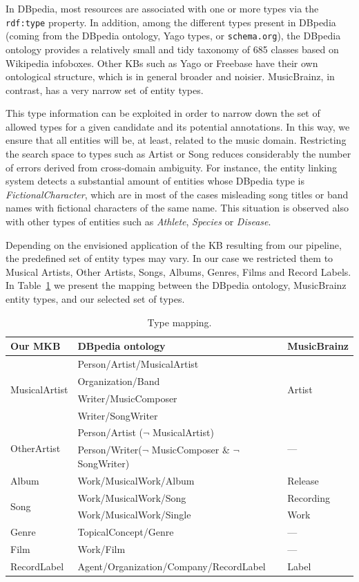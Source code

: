 In DBpedia, most resources are associated with one or more types via the \texttt{rdf:type} property. In addition, among the different types present in DBpedia (coming from the DBpedia ontology, Yago types, or \texttt{schema.org}), the DBpedia ontology provides a relatively small and tidy taxonomy of 685 classes based on Wikipedia infoboxes. Other KBs such as Yago or Freebase have their own ontological structure, which is in general broader and noisier. MusicBrainz, in contrast, has a very narrow set of entity types. 

This type information can be exploited in order to narrow down the set of allowed types for a given candidate and its potential annotations. In this way, we ensure that all entities will be, at least, related to the music domain. Restricting the search space to types such as Artist or Song reduces considerably the number of errors derived from cross-domain ambiguity. For instance, the entity linking system detects a substantial amount of entities whose DBpedia type is \textit{FictionalCharacter}, which are in most of the cases misleading song titles or band names with fictional characters of the same name. This situation is observed also with other types of entities such as \textit{Athlete}, \textit{Species} or \textit{Disease}.

Depending on the envisioned application of the KB resulting from our pipeline, the predefined set of entity types may vary. In our case we restricted them to Musical Artists, Other Artists, Songs, Albums, Genres, Films and Record Labels. In Table~\ref{tbl:kb:type_mapping} we present the mapping between the DBpedia ontology, MusicBrainz entity types, and our selected set of types.

\begin{table}[]
\scriptsize
\centering
	\begin{tabular}{ l l l }
	\hline
\textbf{Our MKB} & \textbf{DBpedia ontology} & \textbf{MusicBrainz} \\
	\hline
\multirow{4}{*}{MusicalArtist} & Person/Artist/MusicalArtist & \multirow{4}{*}{Artist}\\ 
& Organization/Band & \\ 
& Writer/MusicComposer & \\ 
& Writer/SongWriter & \\
	\hline
\multirow{2}{*}{OtherArtist} & Person/Artist ($\neg$ MusicalArtist) & \multirow{2}{*}{---} \\
& Person/Writer($\neg$ MusicComposer \& $\neg$ SongWriter) & \\
    \hline
Album & Work/MusicalWork/Album & Release \\
    \hline
\multirow{2}{*}{Song} & Work/MusicalWork/Song & Recording \\
& Work/MusicalWork/Single & Work \\
    \hline
Genre & TopicalConcept/Genre & --- \\
    \hline
Film & Work/Film & --- \\
    \hline
RecordLabel & Agent/Organization/Company/RecordLabel & Label \\
    \hline
	\end{tabular}
	\caption{Type mapping.}
	\label{tbl:kb:type_mapping}
\end{table}
%

